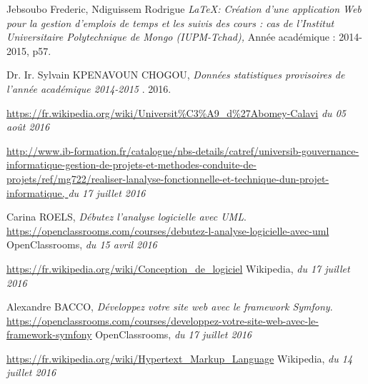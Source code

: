 \begin{thebibliography}{9}

          Jebsoubo Frederic, Ndiguissem Rodrigue
          \emph{\LaTeX: Création d’une application Web pour la gestion d'emplois de temps et les suivis des cours : cas de l’Institut Universitaire Polytechnique de Mongo (IUPM-Tchad), }
          Année académique : 2014-2015, p57.
          
          Dr. Ir. Sylvain KPENAVOUN CHOGOU,
          \emph{Données statistiques provisoires de l’année académique 2014-2015 }.
          2016.  
               
          \url{https://fr.wikipedia.org/wiki/Universit%C3%A9_d%27Abomey-Calavi}
          \emph{du 05 août 2016}

		\url{http://www.ib-formation.fr/catalogue/nbs-details/catref/universib-gouvernance-informatique-gestion-de-projets-et-methodes-conduite-de-projets/ref/mg722/realiser-lanalyse-fonctionnelle-et-technique-dun-projet-informatique, }
		\emph{du 17 juillet 2016}
	
          Carina ROELS,
          \emph{Débutez l'analyse logicielle avec UML}.
          \url{https://openclassrooms.com/courses/debutez-l-analyse-logicielle-avec-uml}
          OpenClassrooms,
          \emph{du 15 avril 2016}
	
          \url{https://fr.wikipedia.org/wiki/Conception_de_logiciel}
          Wikipedia,
          \emph{du 17 juillet 2016}
	
          Alexandre BACCO,
          \emph{Développez votre site web avec le framework Symfony}.
          \url{https://openclassrooms.com/courses/developpez-votre-site-web-avec-le-framework-symfony}
          OpenClassrooms,
          \emph{du 17 juillet 2016}
	
          \url{https://fr.wikipedia.org/wiki/Hypertext_Markup_Language}
          Wikipedia,
          \emph{du 14 juillet 2016}
	
\end{thebibliography}

